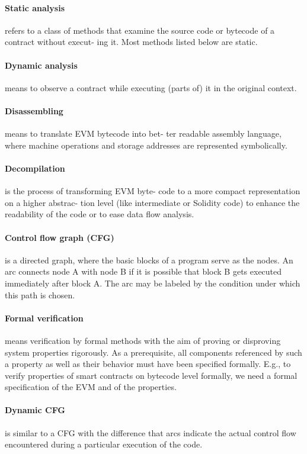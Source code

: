 \documentclass[a4paper,sigconf, language=french,
language=german, language=spanish, language=english]{acmart}
\begin{document}
\paragraph{Static analysis} refers to a class of methods that examine
the source code or bytecode of a contract without execut-
ing it. Most methods listed below are static.
\paragraph{Dynamic analysis} means to observe a contract while
executing (parts of) it in the original context.
\paragraph{Disassembling} means to translate EVM bytecode into bet-
ter readable assembly language, where machine operations
and storage addresses are represented symbolically.
\paragraph{Decompilation} is the process of transforming EVM byte-
code to a more compact representation on a higher abstrac-
tion level (like intermediate or Solidity code) to enhance
the readability of the code or to ease data ﬂow analysis.
\paragraph{Control ﬂow graph (CFG)} is a directed graph, where the
basic blocks of a program serve as the nodes. An arc
connects node A with node B if it is possible that block B
gets executed immediately after block A. The arc may be
labeled by the condition under which this path is chosen.
\paragraph{Formal veriﬁcation} means veriﬁcation by formal methods
with the aim of proving or disproving system properties
rigorously. As a prerequisite, all components referenced
by such a property as well as their behavior must have
been speciﬁed formally. E.g., to verify properties of smart
contracts on bytecode level formally, we need a formal
speciﬁcation of the EVM and of the properties.
\paragraph{Dynamic CFG} is similar to a CFG with the difference that
arcs indicate the actual control ﬂow encountered during a
particular execution of the code.
\end{document}
